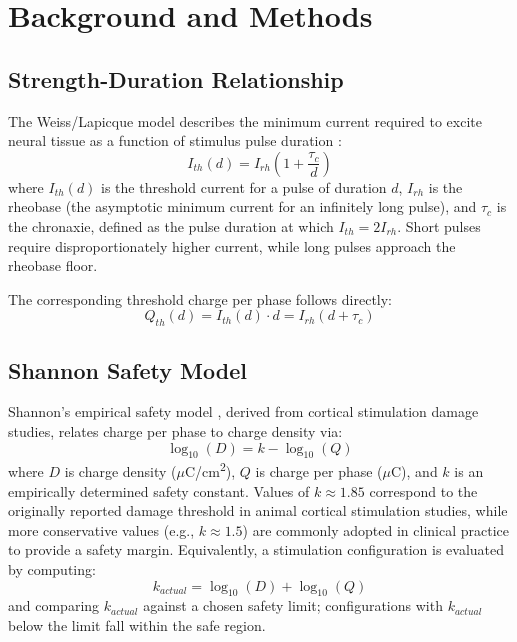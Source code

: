 \documentclass[conference]{IEEEtran}
\begin{document}
\section{Background and Methods}

\subsection{Strength-Duration Relationship}

The Weiss/Lapicque model describes the minimum current required to excite neural tissue as a function of stimulus pulse duration \cite{weiss1901,lapicque1907}:
\begin{equation}
I_{th}(d) = I_{rh}\left(1 + \frac{\tau_c}{d}\right)
\label{eq:strength-duration}
\end{equation}
where $I_{th}(d)$ is the threshold current for a pulse of duration $d$, $I_{rh}$ is the rheobase (the asymptotic minimum current for an infinitely long pulse), and $\tau_c$ is the chronaxie, defined as the pulse duration at which $I_{th} = 2I_{rh}$. Short pulses require disproportionately higher current, while long pulses approach the rheobase floor.

The corresponding threshold charge per phase follows directly:
\begin{equation}
Q_{th}(d) = I_{th}(d) \cdot d = I_{rh}(d + \tau_c)
\label{eq:threshold-charge}
\end{equation}

\subsection{Shannon Safety Model}

Shannon's empirical safety model \cite{shannon1992}, derived from cortical stimulation damage studies, relates charge per phase to charge density via:
\begin{equation}
\log_{10}(D) = k - \log_{10}(Q)
\label{eq:shannon}
\end{equation}
where $D$ is charge density ($\mu$C/cm\textsuperscript{2}), $Q$ is charge per phase ($\mu$C), and $k$ is an empirically determined safety constant. Values of $k \approx 1.85$ correspond to the originally reported damage threshold in animal cortical stimulation studies, while more conservative values (e.g., $k \approx 1.5$) are commonly adopted in clinical practice to provide a safety margin. Equivalently, a stimulation configuration is evaluated by computing:
\begin{equation}
k_{actual} = \log_{10}(D) + \log_{10}(Q)
\end{equation}
and comparing $k_{actual}$ against a chosen safety limit; configurations with $k_{actual}$ below the limit fall within the safe region.
\end{document}
